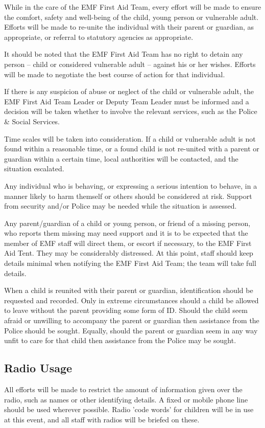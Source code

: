 While in the care of the EMF First Aid Team, every effort will be made to
ensure the comfort, safety and well-being of the child, young person or
vulnerable adult. Efforts will be made to re-unite the
individual with their parent or guardian, as appropriate, or referral to
statutory agencies as appropriate.

It should be noted that the EMF First Aid Team has no right to detain any
person -- child or considered vulnerable adult -- against his or her wishes.
Efforts will be made to negotiate the best course of action for that
individual.

If there is any suspicion of abuse or neglect of the child or vulnerable adult,
the EMF First Aid Team Leader or Deputy Team Leader must be informed and a
decision will be taken whether to involve the relevant services, such as the
Police \& Social Services.

Time scales will be taken into consideration. If a child or vulnerable adult is
not found within a reasonable time, or a found child is not re-united with a
parent or guardian within a certain time, local authorities will be contacted,
and the situation escalated.

Any individual who is behaving, or expressing a serious intention to behave, in
a manner likely to harm themself or others should be considered at risk.
Support from security and/or Police may be needed while the situation is
assessed.

Any parent/guardian of a child or young person, or friend of a missing person,
who reports them missing may need support and it is to be expected that the
member of EMF staff will direct them, or escort if necessary, to the EMF First
Aid Tent. They may be considerably distressed. At this point, staff should keep
details minimal when notifying the EMF First Aid Team; the team will take full
details.

When a child is reunited with their parent or guardian, identification should be
requested and recorded. Only in extreme circumstances should a child be
allowed to leave without the parent providing some form of ID. Should the child
seem afraid or unwilling to accompany the parent or guardian then assistance
from the Police should be sought. Equally, should the parent or guardian
seem in any way unfit to care for that child then assistance from the
Police may be sought.

\subsection{Radio Usage}
All efforts will be made to restrict the amount of information given over the
radio, such as names or other identifying details. A fixed or mobile phone line
should be used wherever possible. Radio 'code words' for children will be in
use at this event, and all staff with radios will be briefed on these.

